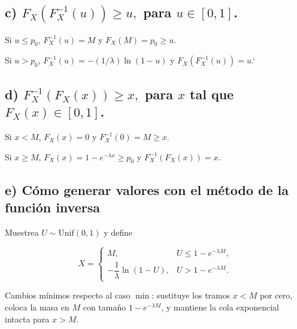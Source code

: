 \documentclass[10pt,a4paper]{article}
\let\le\leqslant
\let\ge\geqslant
\let\leq\leqslant
\let\geq\geqslant
\let\le\leq
\let\ge\geq
\begin{document}
    \begin{center}
    \end{center}
    { \hspace*{\fill} \\}
    
    \hypertarget{c-f_xf-1_xu-geq-u-para-u-in-0-1.}{%
\subsection{\texorpdfstring{c) \(F_X(F^{-1}_X(u)) \geq u,\) para
\(u \in [0, 1]\).}{c) F\_X(F\^{}\{-1\}\_X(u)) \textbackslash geq u, para u \textbackslash in {[}0, 1{]}.}}\label{c-f_xf-1_xu-geq-u-para-u-in-0-1.}}

    Si \(u\le p_0\), \(F_X^{-1}(u)=M\) y \(F_X(M)=p_0\ge u\).

Si \(u>p_0\), \(F_X^{-1}(u)=-(1/\lambda)\ln(1-u)\) y
\(F_X(F_X^{-1}(u))=u\).`

    \hypertarget{d-f-1_xf_xx-geq-x-para-x-tal-que-f_xx-in-0-1.}{%
\subsection{\texorpdfstring{d) \(F^{-1}_X(F_X(x)) \geq x,\) para \(x\)
tal que
\(F_X(x) \in [0, 1]\).}{d) F\^{}\{-1\}\_X(F\_X(x)) \textbackslash geq x, para x tal que F\_X(x) \textbackslash in {[}0, 1{]}.}}\label{d-f-1_xf_xx-geq-x-para-x-tal-que-f_xx-in-0-1.}}

    Si \(x<M\), \(F_X(x)=0\) y \(F_X^{-1}(0)=M\ge x\).

Si \(x\ge M\), \(F_X(x)=1-e^{-\lambda x}\ge p_0\) y
\(F_X^{-1}(F_X(x))=x\).

    \hypertarget{e-cuxf3mo-generar-valores-con-el-muxe9todo-de-la-funciuxf3n-inversa}{%
\subsection{e) Cómo generar valores con el método de la función
inversa}\label{e-cuxf3mo-generar-valores-con-el-muxe9todo-de-la-funciuxf3n-inversa}}

    Muestrea \(U\sim\mathrm{Unif}(0,1)\) y define

\[
X=\begin{cases}
M,& U\le 1-e^{-\lambda M},\\[6pt]
-\dfrac{1}{\lambda}\ln(1-U),& U>1-e^{-\lambda M}.
\end{cases}
\]

Cambios mínimos respecto al caso \(\min\): sustituye los tramos \(x<M\)
por cero, coloca la masa en \(M\) con tamaño \(1-e^{-\lambda M}\), y
mantiene la cola exponencial intacta para \(x>M\).
\end{document}
